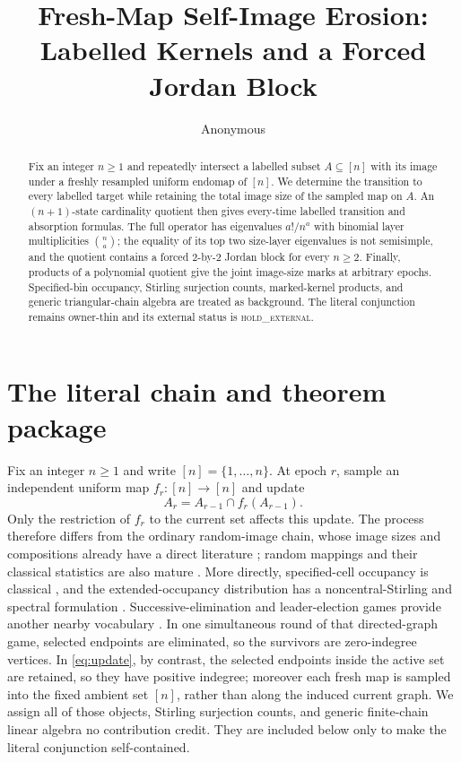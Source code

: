 \documentclass[a4paper,10pt]{amsart}
\title[Fresh-map self-image erosion]{Fresh-Map Self-Image Erosion:\\
Labelled Kernels and a Forced Jordan Block}
\author{Anonymous}
\date{}
\theoremstyle{remark}
\begin{document}
\begin{abstract}
Fix an integer $n\ge1$ and repeatedly intersect a labelled subset
$A\subseteq[n]$ with
its image under a freshly resampled uniform endomap of $[n]$.  We determine
the transition to every labelled target while retaining the total image size
of the sampled map on $A$.  An $(n+1)$-state cardinality quotient then gives
every-time labelled transition and absorption formulas.  The full operator
has eigenvalues $a!/n^a$ with binomial layer multiplicities $\binom na$; the
equality of its top two size-layer eigenvalues is not semisimple, and the quotient contains a
forced $2$-by-$2$ Jordan block for every $n\ge2$.  Finally, products of a
polynomial quotient give the joint image-size marks at arbitrary epochs.
Specified-bin occupancy, Stirling surjection counts, marked-kernel products,
and generic triangular-chain algebra are treated as background.  The literal
conjunction remains owner-thin and its external status is
\textsc{hold\_external}.
\end{abstract}

\maketitle

\section{The literal chain and theorem package}

Fix an integer $n\ge1$ and write $[n]=\{1,\ldots,n\}$.  At epoch $r$,
sample an independent uniform
map $f_r:[n]\to[n]$ and update
\begin{equation}\label{eq:update}
                   A_r=A_{r-1}\cap f_r(A_{r-1}).
\end{equation}
Only the restriction of $f_r$ to the current set affects this update.  The
process therefore differs from the ordinary random-image chain, whose image
sizes and compositions already have a direct literature
\cite{ZubkovSerov2017}; random mappings and their classical statistics are
also mature \cite{FlajoletOdlyzko1990}.  More directly, specified-cell
occupancy is classical \cite{Charalambides1984}, and the extended-occupancy
distribution has a noncentral-Stirling and spectral formulation
\cite{ONeill2023}.  Successive-elimination and
leader-election games provide another nearby vocabulary
\cite{HoffmanJenkinsRoughgarden2002}.  In one simultaneous round of that
directed-graph game, selected endpoints are eliminated, so the survivors are
zero-indegree vertices.  In \eqref{eq:update}, by contrast, the selected
endpoints inside the active set are retained, so they have positive
indegree; moreover each fresh map is sampled into the fixed ambient set
$[n]$, rather than along the induced current graph.  We assign all of those
objects, Stirling surjection counts, and generic finite-chain linear algebra
no contribution credit.  They are included below only to make the literal
conjunction self-contained.
\end{document}

